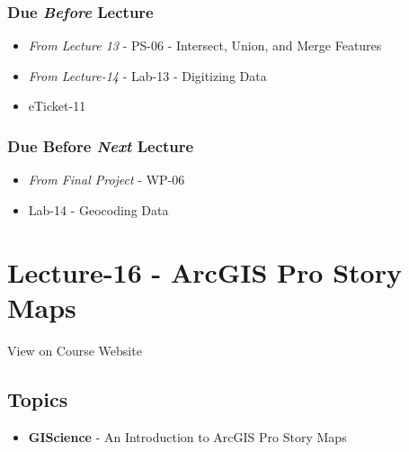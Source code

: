 \documentclass[
]{book}
\providecommand{\tightlist}{%
  \setlength{\itemsep}{0pt}\setlength{\parskip}{0pt}}
\begin{document}
\hypertarget{due-before-lecture-14}{%
\subsubsection*{\texorpdfstring{Due \emph{Before} Lecture}{Due Before Lecture}}\label{due-before-lecture-14}}

\begin{itemize}
\tightlist
\item
  \emph{From Lecture 13} - PS-06 - Intersect, Union, and Merge Features
\item
  \emph{From Lecture-14} - Lab-13 - Digitizing Data
\item
  eTicket-11
\end{itemize}

\hypertarget{due-before-next-lecture-13}{%
\subsubsection*{\texorpdfstring{Due Before \emph{Next} Lecture}{Due Before Next Lecture}}\label{due-before-next-lecture-13}}

\begin{itemize}
\tightlist
\item
  \emph{From Final Project} - WP-06
\item
  Lab-14 - Geocoding Data
\end{itemize}

\hypertarget{lecture-16---arcgis-pro-story-maps}{%
\section*{Lecture-16 - ArcGIS Pro Story Maps}\label{lecture-16---arcgis-pro-story-maps}}

View on Course Website

\hypertarget{topics-16}{%
\subsection*{Topics}\label{topics-16}}

\begin{itemize}
\tightlist
\item
  \textbf{GIScience} - An Introduction to ArcGIS Pro Story Maps
\end{itemize}
\end{document}
